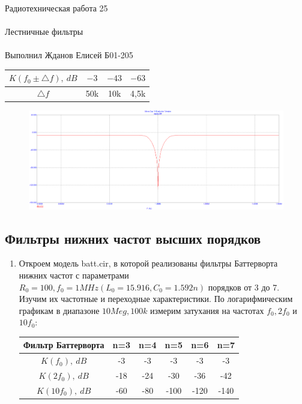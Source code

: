 \documentclass{astroedu-lab}
\begin{document}
\begin{problem}{\huge Радиотехническая работа 25\\\\Лестничные фильтры\\\\Выполнил Жданов Елисей Б01-205}
\begin{enumerate}
\begin{center}
\begin{tabular}{|c|c|c|c|}
\hline 
$K(f_0 \pm \bigtriangleup f), \: dB$ & $-3$ & $-43$ & $-63$ \\ 
\hline 
$\bigtriangleup f$ & 50k & 10k & 4,5k \\ 
\hline 
\end{tabular} 
\end{center}

\begin{figure}[!h]
	\centering
	\includegraphics[width=1\textwidth]{2.7.png}
	\label{fig:boiler}
\end{figure}

\end{enumerate}

\subsection{Фильтры нижних частот высших порядков}

\begin{enumerate}

\item Откроем модель batt.cir, в которой реализованы фильтры Баттерворта нижних частот с параметрами $R_0 = 100, f_0 = 1MHz (L_0= 15.916, C_0 = 1.592n)$ порядков от 3 до 7. Изучим их частотные и переходные характеристики. По логарифмическим графикам в диапазоне $10Meg, 100k$ измерим затухания на частотах $f_0, 2f_0$ и $10f_0$:

\begin{center}
\begin{tabular}{|c|c|c|c|c|c|}
\hline 
Фильтр Баттерворта & n=3 & n=4 & n=5 & n=6 & n=7 \\ 
\hline 
$K(f_0), \: dB$ & -3 & -3 & -3 & -3 & -3 \\ 
\hline 
$K(2f_0), \: dB$ & -18 & -24 & -30 & -36 & -42 \\ 
\hline 
$K(10f_0), \: dB$ & -60 & -80 & -100 & -120 & -140 \\ 
\hline 
\end{tabular} 
\end{center}


\end{enumerate}
\end{problem}
\end{document}

